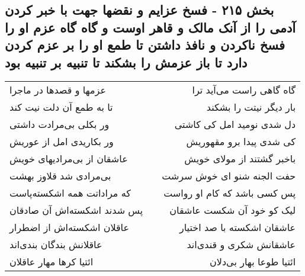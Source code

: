 \begin{center}
\section*{بخش ۲۱۵ - فسخ عزایم و نقضها جهت با خبر کردن آدمی را از آنک مالک و قاهر اوست و گاه گاه عزم او را فسخ ناکردن و نافذ  داشتن تا طمع او را بر عزم کردن  دارد تا باز عزمش را بشکند  تا تنبیه بر تنبیه بود}
\label{sec:sh215}
\begin{longtable}{l p{0.5cm} r}
عزمها و قصدها در ماجرا
&&
گاه گاهی راست می‌آید ترا
\\
تا به طمع آن دلت نیت کند
&&
بار دیگر نیتت را بشکند
\\
ور بکلی بی‌مرادت داشتی
&&
دل شدی نومید امل کی کاشتی
\\
ور بکاریدی امل از عوریش
&&
کی شدی پیدا برو مقهوریش
\\
عاشقان از بی‌مرادیهای خویش
&&
باخبر گشتند از مولای خویش
\\
بی‌مرادی شد قلاوز بهشت
&&
حفت الجنه شنو ای خوش سرشت
\\
که مراداتت همه اشکسته‌پاست
&&
پس کسی باشد که کام او رواست
\\
پس شدند اشکسته‌اش آن صادقان
&&
لیک کو خود آن شکست عاشقان
\\
عاقلان اشکسته‌اش از اضطرار
&&
عاشقان اشکسته با صد اختیار
\\
عاقلانش بندگان بندی‌اند
&&
عاشقانش شکری و قندی‌اند
\\
ائتیا کرها مهار عاقلان
&&
ائتیا طوعا بهار بی‌دلان
\\
\end{longtable}
\end{center}
